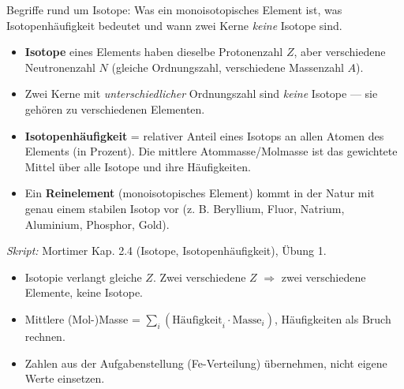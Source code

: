 

Begriffe rund um Isotope: Was ein monoisotopisches Element ist, was
Isotopenhäufigkeit bedeutet und wann zwei Kerne \emph{keine} Isotope sind.

\begin{werkzeugkasten}
\begin{itemize}
  \item \textbf{Isotope} eines Elements haben dieselbe Protonenzahl $Z$, aber
        verschiedene Neutronenzahl $N$ (gleiche Ordnungszahl, verschiedene
        Massenzahl $A$).
  \item Zwei Kerne mit \emph{unterschiedlicher} Ordnungszahl sind
        \emph{keine} Isotope --- sie gehören zu verschiedenen Elementen.
  \item \textbf{Isotopenhäufigkeit} = relativer Anteil eines Isotops an allen
        Atomen des Elements (in Prozent). Die mittlere Atommasse/Molmasse ist
        das gewichtete Mittel über alle Isotope und ihre Häufigkeiten.
  \item Ein \textbf{Reinelement} (monoisotopisches Element) kommt in der
        Natur mit genau einem stabilen Isotop vor (z. B. Beryllium,
        Fluor, Natrium, Aluminium, Phosphor, Gold).
\end{itemize}
\textit{Skript:} Mortimer Kap. 2.4 (Isotope, Isotopenhäufigkeit), Übung 1.
\end{werkzeugkasten}

\begin{achtung}
\begin{itemize}
  \item Isotopie verlangt gleiche $Z$. Zwei verschiedene $Z$ $\Rightarrow$
        zwei verschiedene Elemente, keine Isotope.
  \item Mittlere (Mol-)Masse = $\sum_i (\text{Häufigkeit}_i \cdot
        \text{Masse}_i)$, Häufigkeiten als Bruch rechnen.
  \item Zahlen aus der Aufgabenstellung (Fe-Verteilung) übernehmen, nicht
        eigene Werte einsetzen.
\end{itemize}
\end{achtung}
